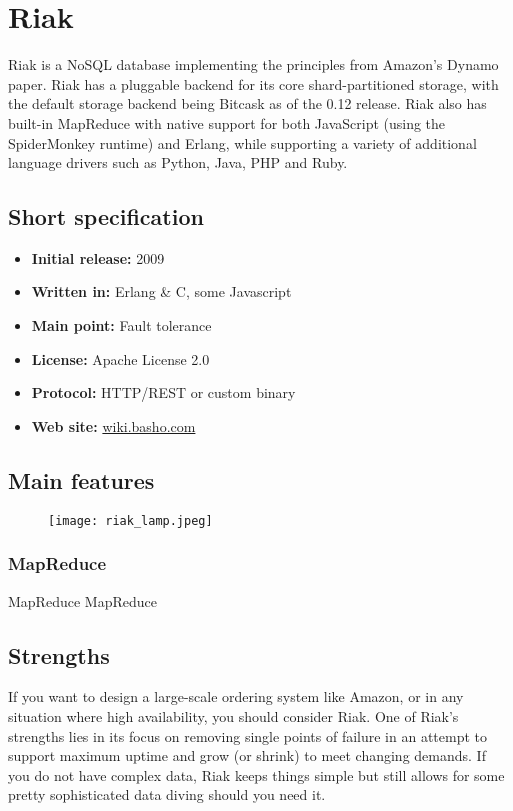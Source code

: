 \chapter{Riak}

Riak is a NoSQL database implementing the principles from Amazon's Dynamo paper.
Riak has a pluggable backend for its core shard-partitioned storage, with the default storage backend being Bitcask as of the 0.12 release. Riak also has built-in MapReduce with native support for both JavaScript (using the SpiderMonkey runtime) and Erlang, while supporting a variety of additional language drivers such as Python, Java, PHP and Ruby.

\section{Short specification}

\begin{itemize}
  \item \textbf{Initial release:} 2009
  \item \textbf{Written in:} Erlang \& C, some Javascript
  \item \textbf{Main point:} Fault tolerance
  \item \textbf{License:} Apache License 2.0
  \item \textbf{Protocol:} HTTP/REST or custom binary
  \item \textbf{Web site:} \href{http://wiki.basho.com/}{wiki.basho.com}
\end{itemize}

\section{Main features}

\begin{figure}[hb]
  \centering
  \texttt{[image: riak\_lamp.jpeg]}
\end{figure}

\subsection{MapReduce}

MapReduce MapReduce

\section{Strengths}

If you want to design a large-scale ordering system like Amazon, or in any situation where high availability, you should consider Riak. One of Riak's strengths lies in its focus on removing single points of failure in an attempt to support maximum uptime and grow (or shrink) to meet changing demands. If you do not have complex data, Riak keeps things simple but still allows for some pretty sophisticated data diving should you need it.\cite{seven_databases}

